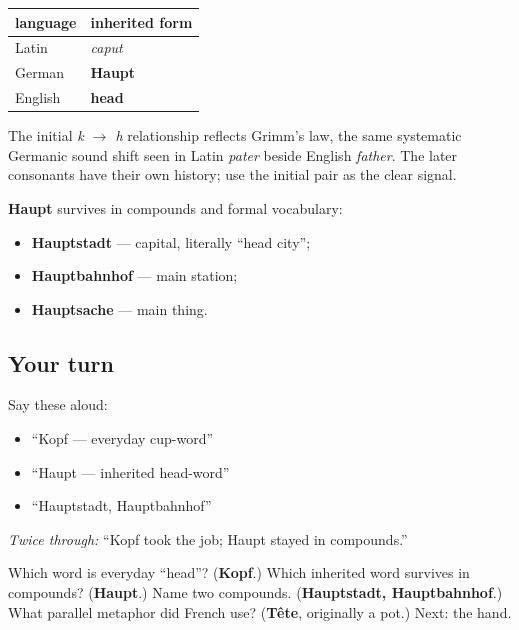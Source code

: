 \begin{cousinweb}
\noindent
\begin{tabularx}{\linewidth}{@{}>{\raggedright\arraybackslash}X>{\raggedright\arraybackslash}X@{}}
\toprule
\textbf{language} & \textbf{inherited form} \\
\midrule
Latin & \emph{caput} \\
German & \textbf{Haupt} \\
English & \textbf{head} \\
\bottomrule
\end{tabularx}

The initial \emph{k $\to$ h} relationship reflects Grimm’s law, the same systematic Germanic sound shift seen in Latin \emph{pater} beside English \emph{father}. The later consonants have their own history; use the initial pair as the clear signal.

\textbf{Haupt} survives in compounds and formal vocabulary:

\begin{itemize}
\raggedright
  \item \textbf{Hauptstadt} — capital, literally “head city”;
  \item \textbf{Hauptbahnhof} — main station;
  \item \textbf{Hauptsache} — main thing.
\end{itemize}
\end{cousinweb}

\subsection*{Your turn}
Say these aloud:

\begin{itemize}
\raggedright
  \item “Kopf — everyday cup-word”
  \item “Haupt — inherited head-word”
  \item “Hauptstadt, Hauptbahnhof”
\end{itemize}

\emph{Twice through:} “Kopf took the job; Haupt stayed in compounds.”

\begin{tcolorbox}[breakable,colback=teal!4,colframe=teal!35!black,title={Before you move on}]
Which word is everyday “head”? (\textbf{Kopf}.) Which inherited word survives in compounds? (\textbf{Haupt}.) Name two compounds. (\textbf{Hauptstadt, Hauptbahnhof}.) What parallel metaphor did French use? (\textbf{Tête}, originally a pot.) Next: the hand.
\end{tcolorbox}
